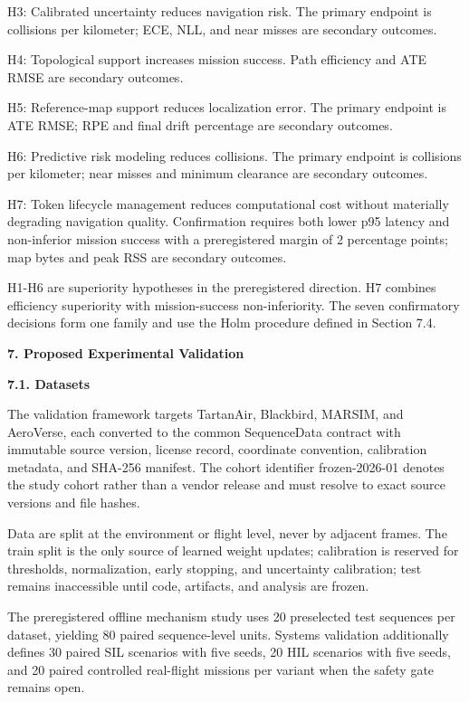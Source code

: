 \documentclass[
]{article}
\begin{document}
H3: Calibrated uncertainty reduces navigation risk. The primary endpoint
is collisions per kilometer; ECE, NLL, and near misses are secondary
outcomes.

H4: Topological support increases mission success. Path efficiency and
ATE RMSE are secondary outcomes.

H5: Reference-map support reduces localization error. The primary
endpoint is ATE RMSE; RPE and final drift percentage are secondary
outcomes.

H6: Predictive risk modeling reduces collisions. The primary endpoint is
collisions per kilometer; near misses and minimum clearance are
secondary outcomes.

H7: Token lifecycle management reduces computational cost without
materially degrading navigation quality. Confirmation requires both
lower p95 latency and non-inferior mission success with a preregistered
margin of 2 percentage points; map bytes and peak RSS are secondary
outcomes.

H1-H6 are superiority hypotheses in the preregistered direction. H7
combines efficiency superiority with mission-success non-inferiority.
The seven confirmatory decisions form one family and use the Holm
procedure defined in Section 7.4.

\textbf{7. Proposed Experimental Validation}

\textbf{7.1. Datasets}

The validation framework targets TartanAir, Blackbird, MARSIM, and
AeroVerse, each converted to the common SequenceData contract with
immutable source version, license record, coordinate convention,
calibration metadata, and SHA-256 manifest. The cohort identifier
frozen-2026-01 denotes the study cohort rather than a vendor release and
must resolve to exact source versions and file hashes.

Data are split at the environment or flight level, never by adjacent
frames. The train split is the only source of learned weight updates;
calibration is reserved for thresholds, normalization, early stopping,
and uncertainty calibration; test remains inaccessible until code,
artifacts, and analysis are frozen.

The preregistered offline mechanism study uses 20 preselected test
sequences per dataset, yielding 80 paired sequence-level units. Systems
validation additionally defines 30 paired SIL scenarios with five seeds,
20 HIL scenarios with five seeds, and 20 paired controlled real-flight
missions per variant when the safety gate remains open.
\end{document}
